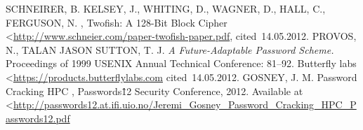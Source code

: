 \documentclass[11pt,oneside,final]{fithesis2}
\begin{document}
\begin{thebibliography}{9}
	 \uppercase{SCHNEIRER, B. KELSEY, J., Whiting, D., Wagner, D., Hall, C., Ferguson, N.} , Twofish: A 128-Bit Block Cipher \textless\url{http://www.schneier.com/paper-twofish-paper.pdf}, cited~14.05.2012.
	 \uppercase{Provos, N., Talan Jason Sutton, T. J.} {\it A Future-Adaptable Password Scheme.} Proceedings of 1999 USENIX Annual Technical Conference: 81--92.
	 Butterfly labs \textless\url{https://products.butterflylabs.com} cited~14.05.2012.
	 \uppercase{Gosney, J. M.} Password Cracking HPC , Passwords\^12 Security Conference, 2012. Available at \textless\url{http://passwords12.at.ifi.uio.no/Jeremi_Gosney_Password_Cracking_HPC_Passwords12.pdf}

\end{thebibliography}
\end{document}
